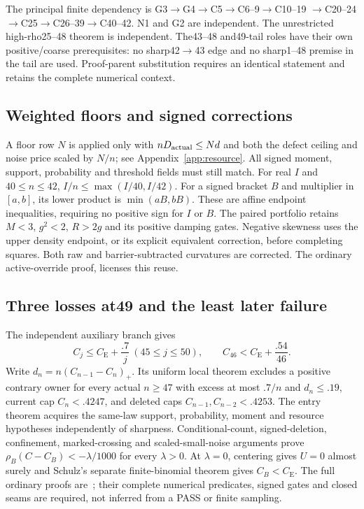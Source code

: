 \documentclass[11pt,a4paper]{article}
\newcommand{\CE}{C_{\mathrm E}}
\begin{document}
The principal finite dependency is G3$\to$G4$\to$C5$\to$C6--9$\to$C10--19
$\to$C20--24$\to$C25$\to$C26--39$\to$C40--42. N1 and G2 are independent.
The unrestricted high-rho25--48 theorem is independent. The43--48 and49-tail
roles have their own positive/coarse prerequisites: no sharp42$\to$43 edge
and no sharp1--48 premise in the tail are used. Proof-parent substitution
requires an identical statement and retains the complete numerical context.

\subsection*{Weighted floors and signed corrections}
A floor row $N$ is applied only with $nD_{\rm actual}\le Nd$ and both
the defect ceiling and noise price scaled by $N/n$; see Appendix~\ref{app:resource}.
All signed moment, support, probability and threshold fields must still match.
For real $I$ and $40\le n\le42$,
$I/n\le\max(I/40,I/42)$. For a signed bracket $B$ and multiplier in
$[a,b]$, its lower product is $\min(aB,bB)$. These are affine endpoint
inequalities, requiring no positive sign for $I$ or $B$.
The paired portfolio retains $M<3$, $g^2<2$, $R>2g$ and its positive
damping gates. Negative skewness uses the upper density endpoint, or its
explicit equivalent correction, before completing squares. Both raw and
barrier-subtracted curvatures are corrected. The ordinary active-override
proof, licenses this reuse.

\subsection*{Three losses at49 and the least later failure}
The independent auxiliary branch gives
\[
 C_j\le\CE+\frac{.7}{j}\ (45\le j\le50),\qquad
 C_{46}<\CE+\frac{.54}{46}.
\]
Write $d_n=n(C_{n-1}-C_n)_+$. Its uniform local theorem excludes a positive contrary owner for every
actual $n\ge47$ with excess at most $.7/n$ and $d_n\le.19$, current cap $C_n<.4247$, and deleted caps
$C_{n-1},C_{n-2}<.4253$. The entry theorem acquires the same-law support,
probability, moment and resource hypotheses independently of sharpness.
Conditional-count, signed-deletion, confinement, marked-crossing and
scaled-small-noise arguments prove $\rho_B(C-C_B)<-\lambda/1000$ for
every $\lambda>0$. At $\lambda=0$, centering gives $U=0$ almost surely
and Schulz's separate finite-binomial theorem gives $C_B<\CE$.
The full ordinary proofs are~\cite[lines7647--8064 and8217--8887]{source};
their complete numerical predicates, signed gates and closed seams are
required, not inferred from a PASS or finite sampling.
\end{document}
